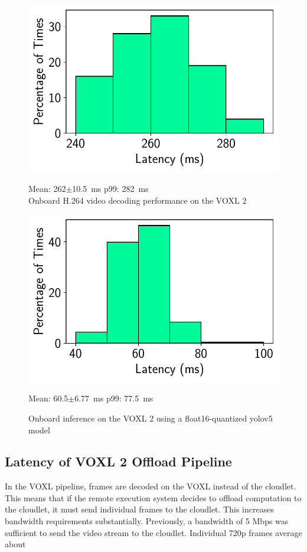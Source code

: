 \begin{figure}[tbp]
\begin{minipage}[t]{0.45\textwidth}
\centerline{\includegraphics[width = \textwidth]{figs/onboard-decoding.pdf}}
\centering
Mean: 262$\pm$10.5~ms\; p99: 282~ms\\
\caption{Onboard H.264 video decoding performance on the VOXL 2}
\label{fig:voxl2-decoding-performance}
\end{minipage}
\hfill
\begin{minipage}[t]{0.45\textwidth}
\centerline{\includegraphics[width = \textwidth]{figs/onboard-inference-hist.pdf}}
\centering
Mean: 60.5$\pm$6.77~ms\; p99: 77.5~ms\\
\caption{Onboard inference on the VOXL 2 using a float16-quantized yolov5 model}
\label{fig:voxl2-inference-hist}
\end{minipage}
\end{figure}

\subsection{Latency of VOXL 2 Offload Pipeline}

In the VOXL pipeline, frames are decoded on the VOXL instead of the cloudlet.
This means that if the remote execution system decides to offload computation
to the cloudlet, it must send individual frames to the cloudlet. This increases
bandwidth requirements substantially. Previously, a bandwidth of 5 Mbps was
sufficient to send the video stream to the cloudlet. Individual 720p frames
average about
